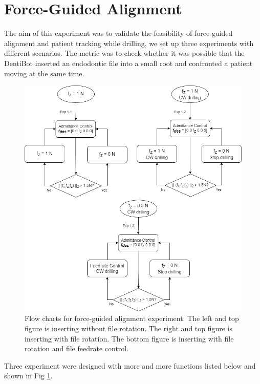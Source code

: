 \section{Force-Guided Alignment}
\hspace*{6mm}The aim of this experiment was to validate the feasibility of force-guided alignment and patient tracking while drilling, we set up three experiments with different scenarios. The metric was to check whether it was possible that the DentiBot inserted an endodontic file into a small root and confronted a patient moving at the same time.
\begin{figure}[htbp]
\begin{center}
\includegraphics[width=1\linewidth]{Images/Exp1_motion planning.png}
\caption{Flow charts for force-guided alignment experiment. The left and top figure is inserting without file rotation. The right and top figure is inserting with file rotation. The bottom figure is inserting with file rotation and file feedrate control.}
\label{fig:exp_motion planning}
\end{center}
\end{figure}
\par	
Three experiment were designed with more and more functions listed below and shown in Fig \ref{fig:exp_motion planning}.

